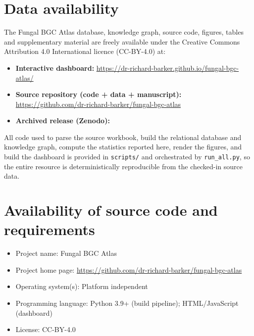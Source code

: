 \section{Data availability}

The Fungal BGC Atlas database, knowledge graph, source code, figures, tables and supplementary
material are freely available under the Creative Commons Attribution 4.0 International licence
(CC-BY-4.0) at:

\begin{itemize}
  \item \textbf{Interactive dashboard:} \url{https://dr-richard-barker.github.io/fungal-bgc-atlas/}
  \item \textbf{Source repository (code + data + manuscript):}
    \url{https://github.com/dr-richard-barker/fungal-bgc-atlas}
  \item \textbf{Archived release (Zenodo):} 
\end{itemize}

All code used to parse the source workbook, build the relational database and knowledge graph,
compute the statistics reported here, render the figures, and build the dashboard is provided in
\texttt{scripts/} and orchestrated by \texttt{run\_all.py}, so the entire resource is
deterministically reproducible from the checked-in source data.

\section*{Availability of source code and requirements}
\begin{itemize}
  \item Project name: Fungal BGC Atlas
  \item Project home page: \url{https://github.com/dr-richard-barker/fungal-bgc-atlas}
  \item Operating system(s): Platform independent
  \item Programming language: Python 3.9+ (build pipeline); HTML/JavaScript (dashboard)
  \item License: CC-BY-4.0
\end{itemize}
